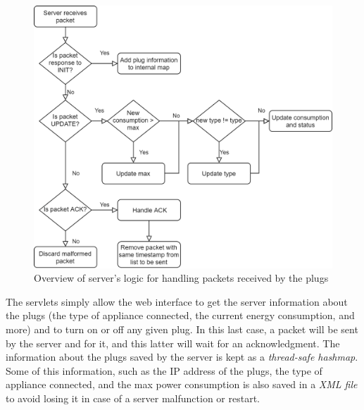 \documentclass[conference]{IEEEtran}
\begin{document}
	\begin{figure}
		\centering
		\includegraphics[width=\linewidth]{assets/server_logic}
		\caption{Overview of server's logic for handling packets received by the plugs}
		\label{fig:server_logic}
	\end{figure}
	The servlets simply allow the web interface to get the server information about the plugs (the type of appliance connected, the current energy consumption, and more) and to turn on or off any given plug. In this last case, a packet will be sent by the server and for it, and this latter will wait for an acknowledgment. The information about the plugs saved by the server is kept as a \textit{thread-safe hashmap}. Some of this information, such as the IP address of the plugs, the type of appliance connected, and the max power consumption is also saved in a \textit{XML file} to avoid losing it in case of a server malfunction or restart.
	
\end{document}
